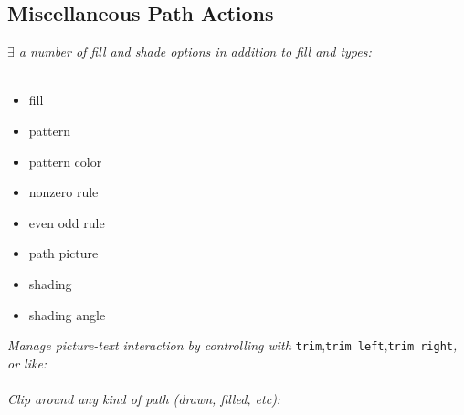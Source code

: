\subsection*{Miscellaneous Path Actions}
\textit{$\exists$ a number of fill and shade options in addition to fill  and  types:}\\
\entry{45mm}{\textbackslash pattern[pattern color=white,}{}
\entry{45mm}{\phantom{xx}pattern=bricks] \dots }{pattern}\\
{\footnotesize \begin{multicols}{2}\begin{itemize}[leftmargin=1pt,label={}]
    \item fill
    \item pattern
    \item pattern color
    \item nonzero rule
    \item even odd rule
    \item path picture
    \item shading
    \item shading angle
\end{itemize}\end{multicols}}

\textit{Manage picture-text interaction by controlling  with }\texttt{trim},\texttt{trim left},\texttt{trim right}\textit{, or like:}\\
\\

\textit{Clip around any kind of path (drawn, filled, etc):}\\
\\



